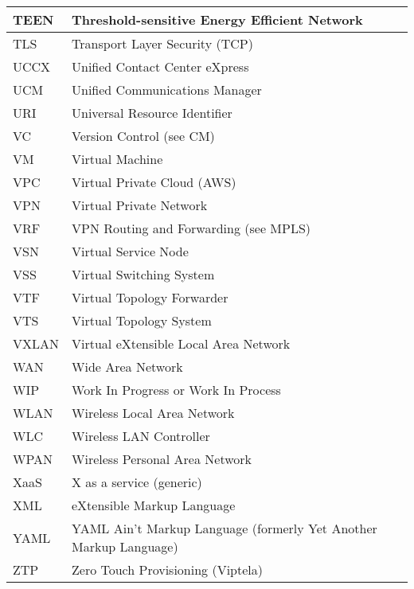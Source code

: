 \begin{longtable}{ll}
  TEEN		&		Threshold-sensitive Energy Efficient Network		\\ \midrule
  TLS		&		Transport Layer Security (TCP)		\\ \midrule
  UCCX		&		Unified Contact Center eXpress		\\ \midrule
  UCM		&		Unified Communications Manager		\\ \midrule
  URI		&		Universal Resource Identifier		\\ \midrule
  VC		&		Version Control (see CM)		\\ \midrule
  VM		&		Virtual Machine		\\ \midrule
  VPC		&		Virtual Private Cloud (AWS)		\\ \midrule
  VPN		&		Virtual Private Network		\\ \midrule
  VRF		&		VPN Routing and Forwarding (see MPLS)		\\ \midrule
  VSN		&		Virtual Service Node		\\ \midrule
  VSS		&		Virtual Switching System		\\ \midrule
  VTF		&		Virtual Topology Forwarder		\\ \midrule
  VTS		&		Virtual Topology System		\\ \midrule
  VXLAN		&		Virtual eXtensible Local Area Network		\\ \midrule
  WAN		&		Wide Area Network		\\ \midrule
  WIP		&		Work In Progress or Work In Process		\\ \midrule
  WLAN		&		Wireless Local Area Network		\\ \midrule
  WLC		&		Wireless LAN Controller		\\ \midrule
  WPAN		&		Wireless Personal Area Network		\\ \midrule
  XaaS		&		X as a service (generic)		\\ \midrule
  XML		&		eXtensible Markup Language		\\ \midrule
  YAML		&		YAML Ain't Markup Language (formerly Yet Another Markup Language)		\\ \midrule
  ZTP		&		Zero Touch Provisioning (Viptela)		\\
  \bottomrule
\end{longtable}
